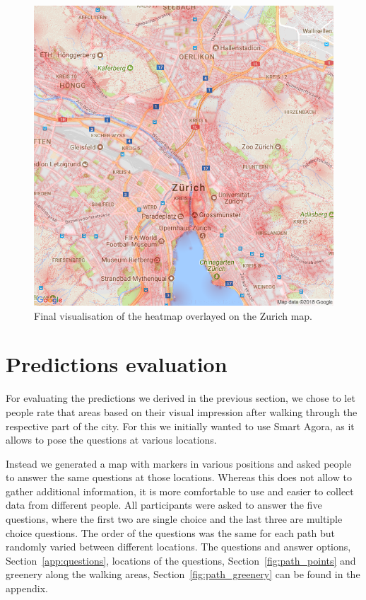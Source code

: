 \documentclass[letterpaper]{article}
\begin{document}
\begin{figure}
    \centering
     \includegraphics[width=.95\linewidth]{images/combined_all.png}
    \caption{Final visualisation of the heatmap overlayed on the Zurich map.}
    \label{fig:ZurichVisualization}
\end{figure}

\section{Predictions evaluation}\label{sec:exp}
For evaluating the predictions we derived in the previous section, we chose to let people rate
that areas based on their visual impression after walking through the respective part of the city.
For this we initially wanted to use Smart Agora, as it allows to pose the questions at various locations.

Instead we generated a map with markers in various positions and asked people to answer the same questions at those locations.
Whereas this does not allow to gather additional information, it is more comfortable to use and easier to collect data from
different people. All participants were asked to answer the five questions, where the first two are single choice
and the last three are multiple choice questions. The order of the questions was the same for each path but randomly varied
between different locations. The questions and answer options, Section~\ref{app:questions}, locations of the questions, Section~\ref{fig:path_points}
and greenery along the walking areas, Section~\ref{fig:path_greenery} can be found in the appendix.
\end{document}
